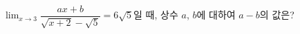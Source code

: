 $\displaystyle\lim_{x\to 3}\dfrac{ax+b}{\sqrt{x+2}-\sqrt{5}}=6\sqrt{5}$일 때, 상수 $a$, $b$에 대하여 $a-b$의 값은?
